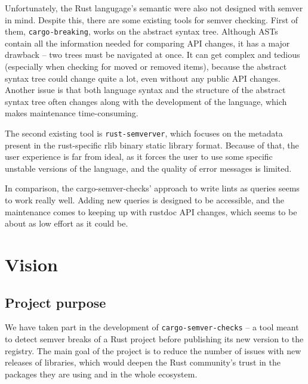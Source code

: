 \documentclass[licencjacka,en]{pracamgr}
\begin{document}
Unfortunately, the Rust langugage's semantic were also not designed with semver in mind.
Despite this, there are some existing tools for semver checking.
First of them, \texttt{cargo-breaking}, works on the abstract syntax tree.
Although ASTs contain all the information needed for comparing API changes,
it has a major drawback -- two trees must be navigated at once.
It can get complex and tedious (especially when checking for moved or removed items), because the abstract syntax tree could change quite a lot,
even without any public API changes.
Another issue is that both language syntax and the structure of the abstract syntax tree
often changes along with the development of the language, which makes maintenance time-consuming.

The second existing tool is \texttt{rust-semverver}, which focuses on
the metadata present in the rust-specific rlib binary static library format.
Because of that, the user experience is far from ideal,
as it forces the user to use some specific unstable versions of the language, and the quality of error messages is limited.

In comparison, the cargo-semver-checks' approach to write lints as queries seems to work really well.
Adding new queries is designed to be accessible, and the maintenance comes to
keeping up with rustdoc API changes, which seems to be about as low effort as it could be.


\chapter{Vision}\label{r:chapter_vision}

\section{Project purpose}

We have taken part in the development of \texttt{cargo-semver-checks}
-- a tool meant to detect semver breaks of a Rust project before publishing
its new version to the registry.
The main goal of the project is to reduce the number of issues with new releases
of libraries, which would deepen the Rust community's trust
in the packages they are using and in the whole ecosystem.
\end{document}
